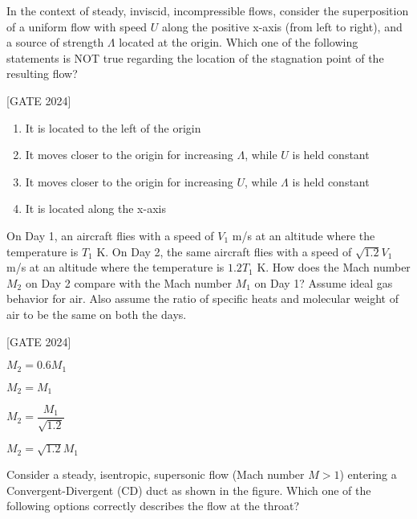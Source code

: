     \item In the context of steady, inviscid, incompressible flows, consider the superposition of a uniform flow with speed $ U $ along the positive x-axis (from left to right), and a source of strength $ \Lambda $ located at the origin. Which one of the following statements is NOT true regarding the location of the stagnation point of the resulting flow?
    
        \hfill{[GATE 2024]}\begin{enumerate}
            \item It is located to the left of the origin
            \item It moves closer to the origin for increasing $ \Lambda $, while $ U $ is held constant
            \item It moves closer to the origin for increasing $ U $, while $ \Lambda $ is held constant
            \item It is located along the x-axis
        \end{enumerate}
    

    \item On Day 1, an aircraft flies with a speed of $ V_1 $ m/s at an altitude where the temperature is $ T_1 $ K. On Day 2, the same aircraft flies with a speed of $ \sqrt{1.2} V_1 $ m/s at an altitude where the temperature is $ 1.2 T_1 $ K. How does the Mach number $ M_2 $ on Day 2 compare with the Mach number $ M_1 $ on Day 1?
    Assume ideal gas behavior for air. Also assume the ratio of specific heats and molecular weight of air to be the same on both the days.
   
        \hfill{[GATE 2024]}\begin{enumerate} \begin{multicols}{2}
            \item $ M_2 = 0.6 M_1 $
            \item $ M_2 = M_1 $
            \item $ M_2 = \dfrac{M_1}{\sqrt{1.2}} $
            \item $ M_2 = \sqrt{1.2} M_1 $
       \end{multicols}  \end{enumerate}
   

    \item Consider a steady, isentropic, supersonic flow (Mach number $ M > 1 $) entering a Convergent-Divergent (CD) duct as shown in the figure. Which one of the following options correctly describes the flow at the throat?
    \begin{center}
\end{center}

